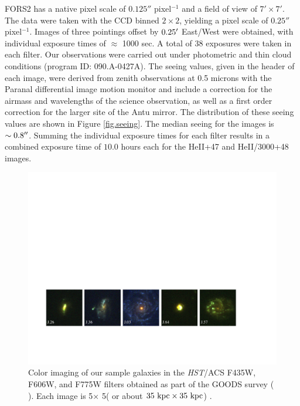 \documentclass[twocolumn]{aastex61}
\begin{document}
FORS2 has a native pixel scale of $0.125''$ pixel$^{-1}$ and a field of view of $7'\times7'$.  The data were taken with 
the CCD binned $2\times2$, yielding a pixel scale of $0.25''$ pixel$^{-1}$.
Images of three pointings offset by $0.25\mbox{$^\prime$}$ East/West were obtained, with individual exposure times of $\approx$ 1000 sec.  A total of 38  exposures were taken in each filter. 
Our observations were carried out under photometric and thin cloud conditions (program ID: 090.A-0427A). 
The seeing values, given in the header of each image, were derived from zenith observations at 0.5 microns with the Paranal differential image motion monitor \citep[DIMM,][]{Sarazin1990} and include a correction for the airmass and wavelengths of the science observation, as well as a first order correction for the larger site of the Antu mirror. The distribution of these seeing values are shown in Figure \ref{fig.seeing}. The median seeing for the images is $\sim 0.8\mbox{$^{\prime\prime}$}$. Summing the individual exposure times for each filter results in a combined exposure time of $10.0$ hours each for the HeII+47 and HeII/3000+48 images.

\begin{figure}[!ht]
\centering
\includegraphics[scale=.75]{../Figures/fors2_color_imstamps.pdf}
\caption{Color imaging of our sample galaxies in the \emph{HST}/ACS F435W, F606W, and F775W filters obtained as part of the GOODS survey (\citeauthor{Giavalisco2004} \citeyear{Giavalisco2004}). Each image is 5\arcsec $\times$ 5\arcsec ( or about $ 35 \rm \ kpc \times 35 \rm \ kpc $) .\label{fig:hstims}}
\end{figure}
\end{document}
